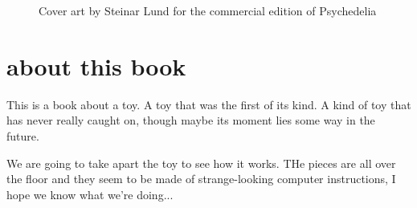 \clearpage
\begin{figure}[H]
    \centering
    \begin{adjustbox}{width=12cm,center}
    \end{adjustbox}
\caption{Cover art by Steinar Lund for the commercial edition of Psychedelia}
\end{figure}
\clearpage
\chapter*{about this book} 
This is a book about a toy. A toy that was the first of its kind. A kind of toy that has never really caught on,
though maybe its moment lies some way in the future. 

We are going to take apart the toy to see how it works. THe pieces are all over the floor and they seem to be made
of strange-looking computer instructions, I hope we know what we're doing...


